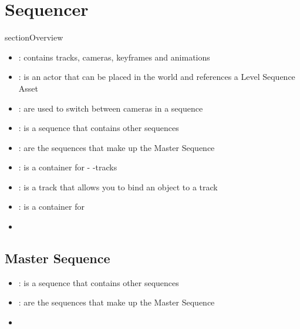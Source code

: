 \chapter{Sequencer}
\label{chap:Sequencer}
    section{Overview}
        \begin{itemize}
            \item {}: contains tracks, cameras, keyframes and animations
            \item {}: is an actor that can be placed in the world and references a Level Sequence Asset
            \item {}: are used to switch between cameras in a sequence
            \item {}: is a sequence that contains other sequences
            \item {}: are the sequences that make up the Master Sequence
            \item {} : is a container for  - -tracks
            \item {} : is a track that allows you to bind an object to a track
            \item {} : is a container for 
            \item 
        \end{itemize}

        \section{Master Sequence}
            \begin{itemize}
                \item {}: is a sequence that contains other sequences
                \item {}: are the sequences that make up the Master Sequence
                \item 
            \end{itemize}

